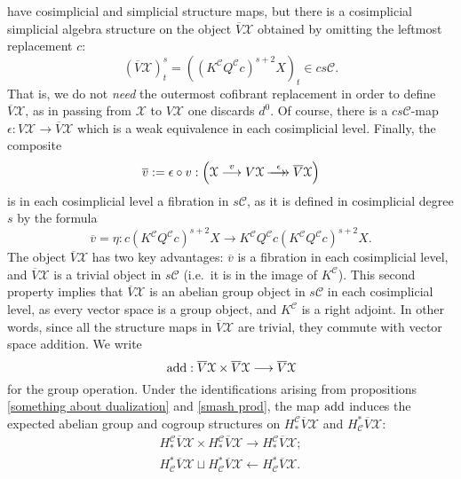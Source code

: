 \documentclass[11pt]{amsart} \renewcommand{\baselinestretch}{1.2}
\theoremstyle{plain}
\numberwithin{equation}{section} %
\theoremstyle{plain}
\numberwithin{equation}{chapter} %
\renewcommand{\to}{\longrightarrow}
\newcommand{\from}{\longleftarrow}
\newcommand{\calx}{\mathcal{X}}
\newcommand{\calc}{\mathcal{C}}
\newcommand{\epi}{{\,\makebox[0cm][l]{\ensuremath\to}\to{}}}
\begin{document}
\begin{Operations on the Bousfield-Kan spectral sequence}
have cosimplicial and simplicial structure maps,
but there is a cosimplicial simplicial algebra structure on the object $\overline{V}\calx$ obtained by omitting the leftmost replacement $c$:
\[(\overline{V}\calx)^s_t=((K^{\calc}Q^{\calc}c)^{s+2}X)_t\in cs\calc.\]
That is, we do not \emph{need} the outermost cofibrant replacement in order to define $\overline{V}\calx$, as in passing from $\calx$ to $V\calx$ one discards $d^0$. Of course, there is a $cs\calc$-map $\epsilon:V\calx \to \overline{V}\calx $ which is a weak equivalence in each cosimplicial level. Finally, the composite
\[\overline{v}:=\epsilon\circ v:\left(\calx\overset{v}{\to}V\calx\overset{\epsilon}{\epi} \overline{V}\calx\right)\]
is in each cosimplicial level a fibration in $s\calc$, as it is defined in cosimplicial degree $s$ by the formula \[\overline{v}=\eta:c(K^{\calc}Q^{\calc}c)^{s+2}X\to K^{\calc}Q^{\calc}c(K^{\calc}Q^{\calc}c)^{s+2}X.\]
 The object $\overline{V}\calx$ has two key advantages: $\overline{v}$ is a fibration in each cosimplicial level, and $\overline{V}\calx$ is a trivial object in $s\calc$ (i.e.\ it is in the image of $K^{\calc}$). This second property implies that  $\overline{V}\calx$ is an abelian group object in $s\calc$ in each cosimplicial level, as every vector space is a group object, and $K^{\calc}$ is a right adjoint. In other words, since all the structure maps in $\overline{V}\calx$ are trivial, they commute  with vector space addition. We write
\[\textup{add}:\overline{V}\calx\times \overline{V}\calx\to \overline{V}\calx\]
for the group operation. Under the identifications arising from propositions \ref{something about dualization} and \ref{smash prod}, the map $\textup{add}$ induces the expected abelian group and cogroup structures on $H_*^\calc\overline{V}\calx$ and $H^*_\calc\overline{V}\calx$:
\begin{gather*}
H_*^\calc\overline{V}\calx\times H_*^\calc\overline{V}\calx\to H_*^\calc\overline{V}\calx;\\
H^*_\calc\overline{V}\calx\sqcup H^*_\calc\overline{V}\calx\from H^*_\calc\overline{V}\calx.
\end{gather*}


\end{Operations on the Bousfield-Kan spectral sequence}
\end{document}
